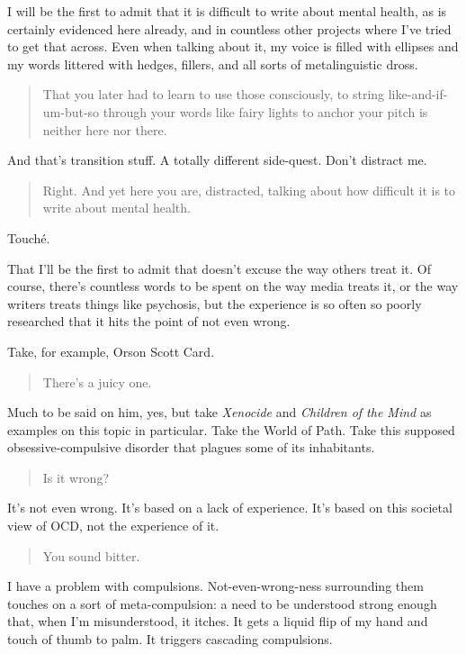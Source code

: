 I will be the first to admit that it is difficult to write about mental health, as is certainly evidenced here already, and in countless other projects where I've tried to get that across. Even when talking about it, my voice is filled with ellipses and my words littered with hedges, fillers, and all sorts of metalinguistic dross.

\begin{quote}
That you later had to learn to use those consciously, to string like-and-if-um-but-so through your words like fairy lights to anchor your pitch is neither here nor there.
\end{quote}

And that's transition stuff. A totally different side-quest. Don't distract me.

\begin{quote}
Right. And yet here you are, distracted, talking about how difficult it is to write about mental health.
\end{quote}

Touché.

That I'll be the first to admit that doesn't excuse the way others treat it. Of course, there's countless words to be spent on the way media treats it, or the way writers treats things like psychosis, but the experience is so often so poorly researched that it hits the point of not even wrong.

Take, for example, Orson Scott Card.

\begin{quote}
There's a juicy one.
\end{quote}

Much to be said on him, yes, but take \emph{Xenocide} and \emph{Children of the Mind} as examples on this topic in particular. Take the World of Path. Take this supposed obsessive-compulsive disorder that plagues some of its inhabitants.

\begin{quote}
Is it wrong?
\end{quote}

It's not even wrong. It's based on a lack of experience. It's based on this societal view of OCD, not the experience of it.

\begin{quote}
You sound bitter.
\end{quote}

I have a problem with compulsions. Not-even-wrong-ness surrounding them touches on a sort of meta-compulsion: a need to be understood strong enough that, when I'm misunderstood, it itches. It gets a liquid flip of my hand and touch of thumb to palm. It triggers cascading compulsions.


